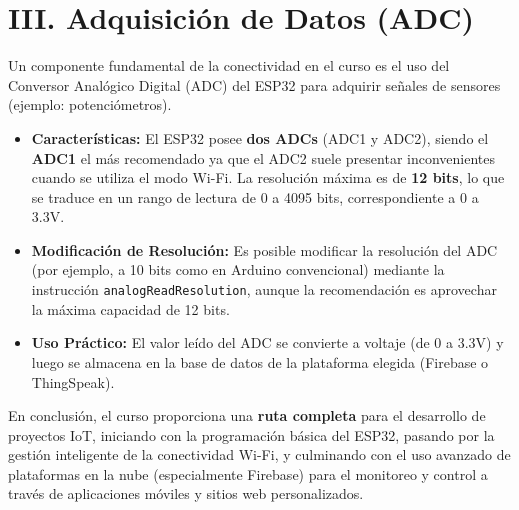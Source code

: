 \documentclass{article}
\begin{document}
\section*{III. Adquisición de Datos (ADC)}

Un componente fundamental de la conectividad en el curso es el uso del Conversor Analógico Digital (ADC) del ESP32 para adquirir señales de sensores (ejemplo: potenciómetros).
\begin{itemize}
    \item \textbf{Características:} El ESP32 posee \textbf{dos ADCs} (ADC1 y ADC2), siendo el \textbf{ADC1} el más recomendado ya que el ADC2 suele presentar inconvenientes cuando se utiliza el modo Wi-Fi. La resolución máxima es de \textbf{12 bits}, lo que se traduce en un rango de lectura de 0 a 4095 bits, correspondiente a 0 a 3.3V.
    \item \textbf{Modificación de Resolución:} Es posible modificar la resolución del ADC (por ejemplo, a 10 bits como en Arduino convencional) mediante la instrucción \texttt{analogReadResolution}, aunque la recomendación es aprovechar la máxima capacidad de 12 bits.
    \item \textbf{Uso Práctico:} El valor leído del ADC se convierte a voltaje (de 0 a 3.3V) y luego se almacena en la base de datos de la plataforma elegida (Firebase o ThingSpeak).
\end{itemize}

En conclusión, el curso proporciona una \textbf{ruta completa} para el desarrollo de proyectos IoT, iniciando con la programación básica del ESP32, pasando por la gestión inteligente de la conectividad Wi-Fi, y culminando con el uso avanzado de plataformas en la nube (especialmente Firebase) para el monitoreo y control a través de aplicaciones móviles y sitios web personalizados.
\end{document}
